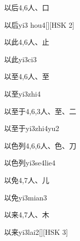 \begin{Entry}{以后}{4,6}{⼈、⼝}
  \begin{Phonetics}{以后}{yi3 hou4}[][HSK 2]
  \end{Phonetics}
\end{Entry}

\begin{Entry}{以此}{4,6}{⼈、⽌}
  \begin{Phonetics}{以此}{yi3ci3}
  \end{Phonetics}
\end{Entry}

\begin{Entry}{以至}{4,6}{⼈、⾄}
  \begin{Phonetics}{以至}{yi3zhi4}
  \end{Phonetics}
\end{Entry}

\begin{Entry}{以至于}{4,6,3}{⼈、⾄、⼆}
  \begin{Phonetics}{以至于}{yi3zhi4yu2}
  \end{Phonetics}
\end{Entry}

\begin{Entry}{以色列}{4,6,6}{⼈、⾊、⼑}
  \begin{Phonetics}{以色列}{yi3se4lie4}
  \end{Phonetics}
\end{Entry}

\begin{Entry}{以免}{4,7}{⼈、⼉}
  \begin{Phonetics}{以免}{yi3mian3}
  \end{Phonetics}
\end{Entry}

\begin{Entry}{以来}{4,7}{⼈、⽊}
  \begin{Phonetics}{以来}{yi3lai2}[][HSK 3]
  \end{Phonetics}
\end{Entry}

